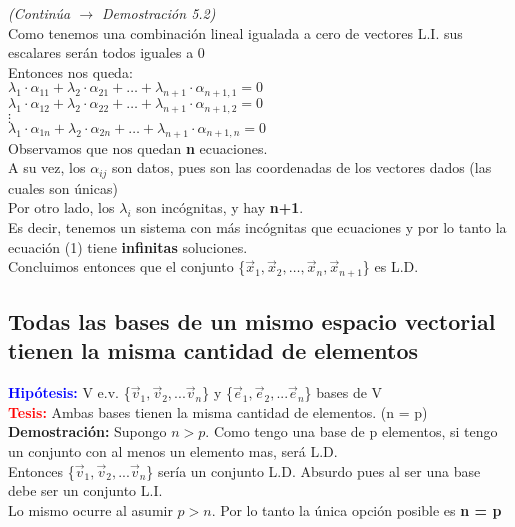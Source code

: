 \documentclass{article}
\begin{document}
\newpage
{\textit{(Continúa $\rightarrow$ Demostración 5.2)}} \\
Como tenemos una combinación lineal igualada a cero de vectores L.I. sus escalares serán todos iguales a 0\\
Entonces nos queda: \\
$\lambda_1\cdot\alpha_{11} + \lambda_2\cdot\alpha_{21} + \hdots + \lambda_{n+1}\cdot\alpha_{n+1,1} = 0$\\
$\lambda_1\cdot\alpha_{12} + \lambda_2\cdot\alpha_{22} + \hdots + \lambda_{n+1}\cdot\alpha_{n+1,2} = 0$\\
$\vdots$\\
$\lambda_1\cdot\alpha_{1n} + \lambda_2\cdot\alpha_{2n} + \hdots + \lambda_{n+1}\cdot\alpha_{n+1,n}=0$\\
Observamos que nos quedan {\bfseries n} ecuaciones.\\
A su vez, los $\alpha_{ij}$ son datos, pues son las coordenadas de los vectores dados (las cuales son únicas)\\
Por otro lado, los $\lambda_i$ son incógnitas, y hay {\bfseries n+1}.\\
Es decir, tenemos un sistema con más incógnitas que ecuaciones y por lo tanto la ecuación (1) tiene {\bfseries infinitas} soluciones. \\
Concluimos entonces que el conjunto \{$\vec{x}_{1}, \vec{x}_2,\hdots, \vec{x}_n, \vec{x}_{n+1} $\} es L.D.
\subsection{Todas las bases de un mismo espacio vectorial tienen la misma cantidad de elementos}
{\bfseries \textcolor{blue}{Hipótesis:}} V e.v. \{$\vec{v}_{1}, \vec{v}_2,... \vec{v}_n $\} y \{$\vec{e}_{1}, \vec{e}_2,... \vec{e}_n $\} bases de V\\
{\bfseries \textcolor{red}{Tesis:}} Ambas bases tienen la misma cantidad de elementos. (n = p)\\
{\bfseries Demostración:} Supongo $n>p$. Como tengo una base de p elementos, si tengo un conjunto con al menos un elemento mas, será L.D.\\
Entonces \{$\vec{v}_{1}, \vec{v}_2,... \vec{v}_n $\} sería un conjunto L.D. Absurdo pues al ser una base debe ser un conjunto L.I.\\
Lo mismo ocurre al asumir $p>n$. Por lo tanto la única opción posible es {\bfseries n = p}
\end{document}
